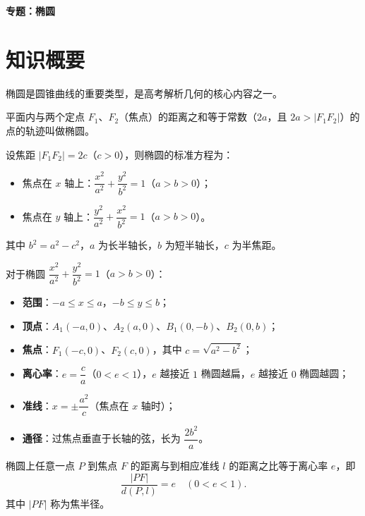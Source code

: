 \documentclass[11pt]{ctexrep}
\begin{document}
\begin{center}
    {\LARGE\bfseries 专题：椭圆}
\end{center}

\section*{知识概要}

椭圆是圆锥曲线的重要类型，是高考解析几何的核心内容之一。

\begin{definition}[椭圆的定义]
    平面内与两个定点 $F_1$、$F_2$（焦点）的距离之和等于常数（$2a$，且 $2a > |F_1F_2|$）的点的轨迹叫做椭圆。
    
    设焦距 $|F_1F_2| = 2c$（$c > 0$），则椭圆的标准方程为：
    \begin{itemize}
        \item 焦点在 $x$ 轴上：$\dfrac{x^2}{a^2} + \dfrac{y^2}{b^2} = 1$（$a > b > 0$）；
        \item 焦点在 $y$ 轴上：$\dfrac{y^2}{a^2} + \dfrac{x^2}{b^2} = 1$（$a > b > 0$）。
    \end{itemize}
    其中 $b^2 = a^2 - c^2$，$a$ 为长半轴长，$b$ 为短半轴长，$c$ 为半焦距。
\end{definition}

\begin{property}[椭圆的几何性质]
    对于椭圆 $\dfrac{x^2}{a^2} + \dfrac{y^2}{b^2} = 1$（$a > b > 0$）：
    \begin{itemize}
        \item \textbf{范围}：$-a \leq x \leq a$，$-b \leq y \leq b$；
        \item \textbf{顶点}：$A_1(-a, 0)$、$A_2(a, 0)$、$B_1(0, -b)$、$B_2(0, b)$；
        \item \textbf{焦点}：$F_1(-c, 0)$、$F_2(c, 0)$，其中 $c = \sqrt{a^2 - b^2}$；
        \item \textbf{离心率}：$e = \dfrac{c}{a}$（$0 < e < 1$），$e$ 越接近 $1$ 椭圆越扁，$e$ 越接近 $0$ 椭圆越圆；
        \item \textbf{准线}：$x = \pm \dfrac{a^2}{c}$（焦点在 $x$ 轴时）；
        \item \textbf{通径}：过焦点垂直于长轴的弦，长为 $\dfrac{2b^2}{a}$。
    \end{itemize}
\end{property}

\begin{property}[椭圆的第二定义]
    椭圆上任意一点 $P$ 到焦点 $F$ 的距离与到相应准线 $l$ 的距离之比等于离心率 $e$，即
    \[
        \frac{|PF|}{d(P, l)} = e \quad (0 < e < 1).
    \]
    其中 $|PF|$ 称为焦半径。
\end{property}
\end{document}
